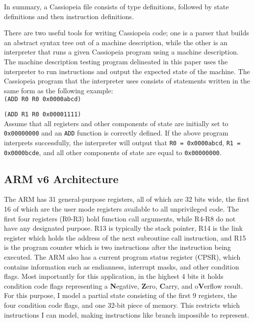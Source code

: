 \documentclass[letterpaper,12pt]{article}
\begin{document}
In summary, a Cassiopeia file consists of type definitions, followed by state definitions and then instruction definitions.

There are two useful tools for writing Cassiopeia code; one is a parser that builds an abstract syntax tree out of a machine description, while the other is an interpreter that runs a given Cassiopeia program using a machine description. The machine description testing program delineated in this paper uses the interpreter to run instructions and output the expected state of the machine. The Cassiopeia program that the interpreter uses consists of statements written in the same form as the following example:\\

\texttt{(ADD R0 R0 0x0000abcd)}

\texttt{(ADD R1 R0 0x00001111)}\\

Assume that all registers and other components of state are initially set to \texttt{0x00000000} and an \texttt{ADD} function is correctly defined. If the above program interprets successfully, the interpreter will output that \texttt{R0 = 0x0000abcd}, \texttt{R1 = 0x0000bcde}, and all other components of state are equal to \texttt{0x00000000}.

\subsection{ARM v6 Architecture}

The ARM has 31 general-purpose registers, all of which are 32 bits wide, the first 16 of which are the user mode registers available to all unprivileged code. The first four registers (R0-R3) hold function call arguments, while R4-R8 do not have any designated purpose. R13 is typically the stack pointer, R14 is the link register which holds the address of the next subroutine call instruction, and R15 is the program counter which is two instructions after the instruction being executed. The ARM also has a current program status register (CPSR), which contains information such as endianness, interrupt masks, and other condition flags. Most importantly for this application, in the highest 4 bits it holds condition code flags representing a \textbf{N}egative, \textbf{Z}ero, \textbf{C}arry, and o\textbf{V}erflow result\cite{ARM}. For this purpose, I model a partial state consisting of the first 9 registers, the four condition code flags, and one 32-bit piece of memory. This restricts which instructions I can model, making instructions like branch impossible to represent.
\end{document}
